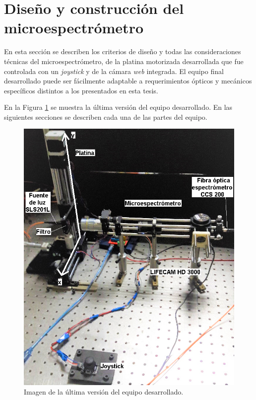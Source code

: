 \singlespacing
\section{Diseño y construcción del microespectrómetro}
\label{sec:montcontmsp}

\hspace{0.5cm}En esta sección se describen los criterios de diseño y todas las consideraciones técnicas del microespectrómetro, de la platina motorizada desarrollada que fue controlada con un \textit{joystick} y de la cámara \textit{web} integrada. El equipo final desarrollado puede ser fácilmente adaptable a requerimientos ópticos y mecánicos específicos distintos a los presentados en esta tesis.

En la Figura \ref{fig:presequipo} se muestra la última versión del equipo desarrollado. En las siguientes secciones se describen cada una de las partes del equipo.

\begin{figure}[H]
	\centering
	\includegraphics[scale=0.95]{Figs/microespectrometro/presentacion_equipo.png}
	\caption{Imagen de la última versión del equipo desarrollado.}
	\label{fig:presequipo}
\end{figure}


